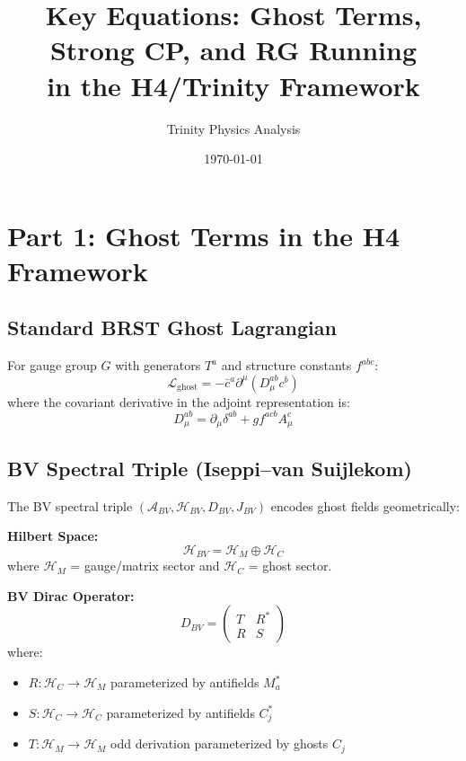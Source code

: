 \documentclass[11pt]{article}
\begin{document}
\title{Key Equations: Ghost Terms, Strong CP, and RG Running\\in the H4/Trinity Framework}
\author{Trinity Physics Analysis}
\date{\today}
\maketitle

\section{Part 1: Ghost Terms in the H4 Framework}

\subsection{Standard BRST Ghost Lagrangian}
For gauge group $G$ with generators $T^a$ and structure constants $f^{abc}$:
\begin{equation}
\mathcal{L}_{\text{ghost}} = -\bar{c}^a \partial^\mu (D_\mu^{ab} c^b)
\end{equation}
where the covariant derivative in the adjoint representation is:
\begin{equation}
D_\mu^{ab} = \partial_\mu \delta^{ab} + g f^{acb} A_\mu^c
\end{equation}

\subsection{BV Spectral Triple (Iseppi--van Suijlekom)}
The BV spectral triple $(\mathcal{A}_{BV}, \mathcal{H}_{BV}, D_{BV}, J_{BV})$ encodes ghost fields geometrically:

\textbf{Hilbert Space:}
\begin{equation}
\mathcal{H}_{BV} = \mathcal{H}_M \oplus \mathcal{H}_C
\end{equation}
where $\mathcal{H}_M$ = gauge/matrix sector and $\mathcal{H}_C$ = ghost sector.

\textbf{BV Dirac Operator:}
\begin{equation}
D_{BV} = \begin{pmatrix} T & R^* \\ R & S \end{pmatrix}
\end{equation}
where:
\begin{itemize}
\item $R: \mathcal{H}_C \to \mathcal{H}_M$ parameterized by antifields $M_a^*$
\item $S: \mathcal{H}_C \to \mathcal{H}_C$ parameterized by antifields $C_j^*$
\item $T: \mathcal{H}_M \to \mathcal{H}_M$ odd derivation parameterized by ghosts $C_j$
\end{itemize}
\end{document}
